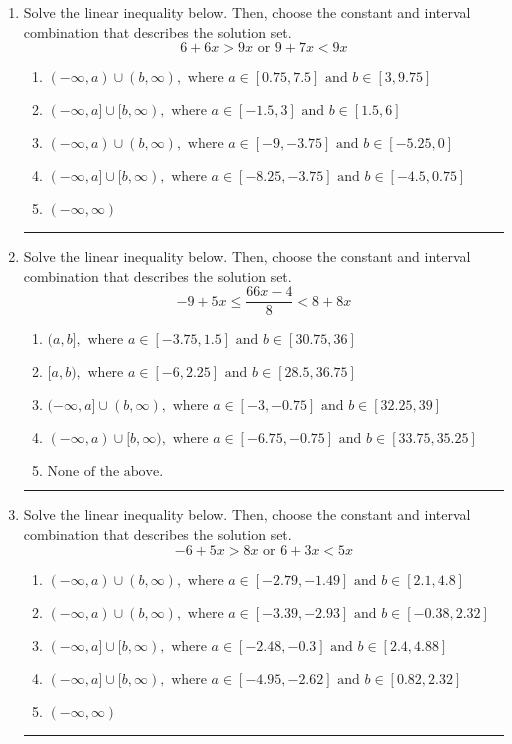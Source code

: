 \documentclass[14pt]{extbook}
\newcommand{\litem}[1]{\item#1\hspace*{-1cm}\rule{\textwidth}{0.4pt}}
\begin{document}
\begin{enumerate}
{\begin{enumerate}[label=\Alph*.]
\end{enumerate} }
\litem{
Solve the linear inequality below. Then, choose the constant and interval combination that describes the solution set.\[ 6 + 6 x > 9 x \text{ or } 9 + 7 x < 9 x \]\begin{enumerate}[label=\Alph*.]
\item \( (-\infty, a) \cup (b, \infty), \text{ where } a \in [0.75, 7.5] \text{ and } b \in [3, 9.75] \)
\item \( (-\infty, a] \cup [b, \infty), \text{ where } a \in [-1.5, 3] \text{ and } b \in [1.5, 6] \)
\item \( (-\infty, a) \cup (b, \infty), \text{ where } a \in [-9, -3.75] \text{ and } b \in [-5.25, 0] \)
\item \( (-\infty, a] \cup [b, \infty), \text{ where } a \in [-8.25, -3.75] \text{ and } b \in [-4.5, 0.75] \)
\item \( (-\infty, \infty) \)

\end{enumerate} }
\litem{
Solve the linear inequality below. Then, choose the constant and interval combination that describes the solution set.\[ -9 + 5 x \leq \frac{66 x - 4}{8} < 8 + 8 x \]\begin{enumerate}[label=\Alph*.]
\item \( (a, b], \text{ where } a \in [-3.75, 1.5] \text{ and } b \in [30.75, 36] \)
\item \( [a, b), \text{ where } a \in [-6, 2.25] \text{ and } b \in [28.5, 36.75] \)
\item \( (-\infty, a] \cup (b, \infty), \text{ where } a \in [-3, -0.75] \text{ and } b \in [32.25, 39] \)
\item \( (-\infty, a) \cup [b, \infty), \text{ where } a \in [-6.75, -0.75] \text{ and } b \in [33.75, 35.25] \)
\item \( \text{None of the above.} \)

\end{enumerate} }
\litem{
Solve the linear inequality below. Then, choose the constant and interval combination that describes the solution set.\[ -6 + 5 x > 8 x \text{ or } 6 + 3 x < 5 x \]\begin{enumerate}[label=\Alph*.]
\item \( (-\infty, a) \cup (b, \infty), \text{ where } a \in [-2.79, -1.49] \text{ and } b \in [2.1, 4.8] \)
\item \( (-\infty, a) \cup (b, \infty), \text{ where } a \in [-3.39, -2.93] \text{ and } b \in [-0.38, 2.32] \)
\item \( (-\infty, a] \cup [b, \infty), \text{ where } a \in [-2.48, -0.3] \text{ and } b \in [2.4, 4.88] \)
\item \( (-\infty, a] \cup [b, \infty), \text{ where } a \in [-4.95, -2.62] \text{ and } b \in [0.82, 2.32] \)
\item \( (-\infty, \infty) \)


\end{enumerate}}
\end{enumerate}
\end{document}
